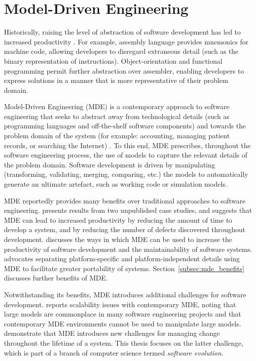 
\section{Model-Driven Engineering}
Historically, raising the level of abstraction of software development has led to increased productivity \cite{brooks86nosilverbullet,boehm06view,kelly08dsm}. For example, assembly language provides mnemonics for machine code, allowing developers to disregard extraneous detail (such as the binary representation of instructions). Object-orientation and functional programming permit further abstraction over assembler, enabling developers to express solutions in a manner that is more representative of their problem domain.

Model-Driven Engineering (MDE) is a contemporary approach to software engineering that seeks to abstract away from technological details (such as programming languages and off-the-shelf software components) and towards the problem domain of the system (for example: accounting, managing patient records, or searching the Internet) \cite{frankel02mda,kleppe03mda,selic03pragmatics}. To this end, MDE prescribes, throughout the software engineering process, the use of models to capture the relevant details of the problem domain. Software development is driven by manipulating (transforming, validating, merging, comparing, etc.) the models to automatically generate an ultimate artefact, such as working code or simulation models.

MDE reportedly provides many benefits over traditional approaches to software engineering. \cite{watson08mdahistory} presents results from two unpublished case studies, and suggests that MDE can lead to increased productivity by reducing the amount of time to develop a system, and by reducing the number of defects discovered throughout development. \cite{kleppe03mda} discusses the ways in which MDE can be used to increase the productivity of software development and the maintainability of software systems. \cite{frankel02mda} advocates separating platform-specific and platform-independent details using MDE to facilitate greater portability of systems. Section~\ref{subsec:mde_benefits} discusses further benefits of MDE. 

Notwithstanding its benefits, MDE introduces additional challenges for software development. \cite{kolovos08scalability} reports scalability issues with contemporary MDE, noting that large models are commonplace in many software engineering projects and that contemporary MDE environments cannot be used to manipulate large models. \cite{Mens07} demonstrate that MDE introduces new challenges for managing change throughout the lifetime of a system. This thesis focuses on the latter challenge, which is part of a branch of computer science termed \emph{software evolution}.

